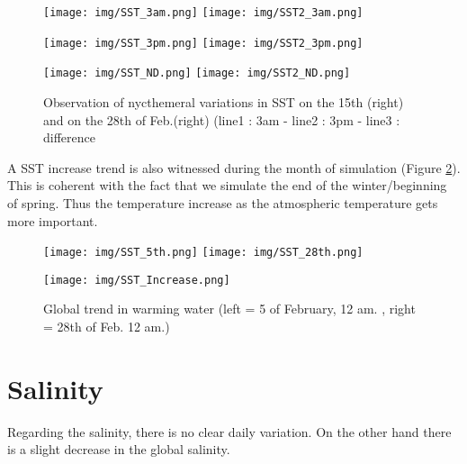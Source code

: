 \documentclass[english]{PFeENSTA}
\begin{document}
{\begin{figure}[H]
   \begin{minipage}[h!]{1\linewidth}
   \centering
   \texttt{[image: img/SST\_3am.png]}
   \texttt{[image: img/SST2\_3am.png]}
  \end{minipage}
   \begin{minipage}[h!]{1\linewidth}
   \centering
   \texttt{[image: img/SST\_3pm.png]}
   \texttt{[image: img/SST2\_3pm.png]}
  \end{minipage}
     \begin{minipage}[h!]{1\linewidth}
   \centering
   \texttt{[image: img/SST\_ND.png]}
   \texttt{[image: img/SST2\_ND.png]}
  \end{minipage}
 \caption{\label{fig:T_results_nycthemeral}Observation of nycthemeral variations in SST on the 15th (right) and on the 28th of Feb.(right) (line1 : 3am - line2 : 3pm - line3 : difference}
\end{figure}

A SST increase trend is also witnessed during the month of simulation (Figure \ref{fig:T_results_GlobIncrease}). This is coherent with the fact that we simulate the end of the winter/beginning of spring. Thus the temperature increase as the atmospheric temperature  gets more important. 

\begin{figure}[H]
   \begin{minipage}[h!]{1\linewidth}
   \centering
   \texttt{[image: img/SST\_5th.png]}
   \texttt{[image: img/SST\_28th.png]}
  \end{minipage}
   \begin{minipage}[h!]{1\linewidth}
   \centering
   \texttt{[image: img/SST\_Increase.png]}
  \end{minipage}
 \caption{\label{fig:T_results_GlobIncrease}Global trend in warming water (left = 5 of February, 12 am. , right = 28th of Feb. 12 am.)}
\end{figure}

\section{Salinity}

Regarding the salinity, there is no clear daily variation. On the other hand there is a  slight decrease in the global salinity. 

}
\end{document}
